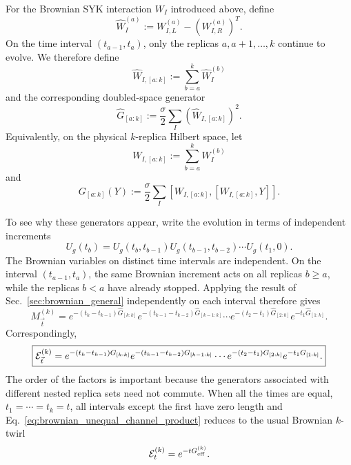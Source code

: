 \documentclass{article}
\theoremstyle{definition}
\begin{document}
For the Brownian SYK interaction $W_I$ introduced above, define
\begin{equation}
    \widehat W_I^{(a)}
    :=
    W_{I,L}^{(a)}
    -
    \left(W_{I,R}^{(a)}\right)^T .
\end{equation}
On the time interval $(t_{a-1},t_a)$, only the replicas
$a,a+1,\ldots,k$ continue to evolve.  We therefore define
\begin{equation}
    \widehat W_{I,[a:k]}
    :=
    \sum_{b=a}^k
    \widehat W_I^{(b)}
\end{equation}
and the corresponding doubled-space generator
\begin{equation}
    \widehat G_{[a:k]}
    :=
    \frac{\sigma}{2}
    \sum_I
    \left(
       \widehat W_{I,[a:k]}
    \right)^2.
    \label{eq:brownian_nested_Ghat}
\end{equation}
Equivalently, on the physical $k$-replica Hilbert space, let
\begin{equation}
    W_{I,[a:k]}
    :=
    \sum_{b=a}^k W_I^{(b)}
\end{equation}
and
\begin{equation}
    G_{[a:k]}(Y)
    :=
    \frac{\sigma}{2}
    \sum_I
    [W_{I,[a:k]},[W_{I,[a:k]},Y]].
    \label{eq:brownian_nested_G}
\end{equation}

To see why these generators appear, write the evolution in terms of
independent increments
\begin{equation}
    U_g(t_b)
    =
    U_g(t_b,t_{b-1})
    U_g(t_{b-1},t_{b-2})
    \cdots
    U_g(t_1,0).
\end{equation}
The Brownian variables on distinct time intervals are independent.  On
the interval $(t_{a-1},t_a)$, the same Brownian increment acts on all
replicas $b\geq a$, while the replicas $b<a$ have already stopped.
Applying the result of Sec.~\ref{sec:brownian_general} independently on
each interval therefore gives
\begin{equation}
    \boxed{
    M^{(k)}_{\vec t}
    =
    e^{-(t_k-t_{k-1})\widehat G_{[k:k]}}
    e^{-(t_{k-1}-t_{k-2})\widehat G_{[k-1:k]}}
    \cdots
    e^{-(t_2-t_1)\widehat G_{[2:k]}}
    e^{-t_1\widehat G_{[1:k]}} .
    }
    \label{eq:brownian_unequal_moment_product}
\end{equation}
Correspondingly,
\begin{equation}
    \boxed{
    {\cal E}^{(k)}_{\vec t}
    =
    e^{-(t_k-t_{k-1})G_{[k:k]}}
    e^{-(t_{k-1}-t_{k-2})G_{[k-1:k]}}
    \cdots
    e^{-(t_2-t_1)G_{[2:k]}}
    e^{-t_1G_{[1:k]}} .
    }
    \label{eq:brownian_unequal_channel_product}
\end{equation}
The order of the factors is important because the generators associated
with different nested replica sets need not commute.  When all the times
are equal, $t_1=\cdots=t_k=t$, all intervals except the first have zero
length and Eq.~\eqref{eq:brownian_unequal_channel_product} reduces to the
usual Brownian $k$-twirl
\begin{equation}
    {\cal E}^{(k)}_{t}
    =
    e^{-tG_{\rm eff}^{(k)}}.
\end{equation}
\end{document}
